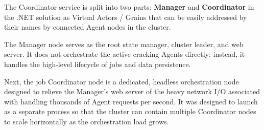 The Coordinator service is split into two parts: \textbf{Manager} and \textbf{Coordinator} in the .NET solution as Virtual Actors / Grains that can be easily addressed by their names by connected Agent nodes in the cluster.

The Manager node serves as the root state manager, cluster leader, and web server. It does not orchestrate the active cracking Agents directly; instead, it handles the high-level lifecycle of jobs and data persistence.

Next, the job Coordinator node is a dedicated, headless orchestration node designed to relieve the Manager's web server of the heavy network I/O associated with handling thousands of Agent requests per second. It was designed to launch as a separate process so that the cluster can contain multiple Coordinator nodes to scale horizontally as the orchestration load grows.
    

